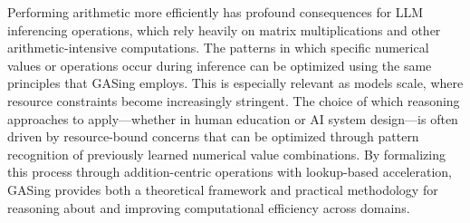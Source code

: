 Performing arithmetic more efficiently has profound consequences for LLM inferencing operations, which rely heavily on matrix multiplications and other arithmetic-intensive computations. The patterns in which specific numerical values or operations occur during inference can be optimized using the same principles that GASing employs. This is especially relevant as models scale, where resource constraints become increasingly stringent. The choice of which reasoning approaches to apply—whether in human education or AI system design—is often driven by resource-bound concerns that can be optimized through pattern recognition of previously learned numerical value combinations. By formalizing this process through addition-centric operations with lookup-based acceleration, GASing provides both a theoretical framework and practical methodology for reasoning about and improving computational efficiency across domains.
